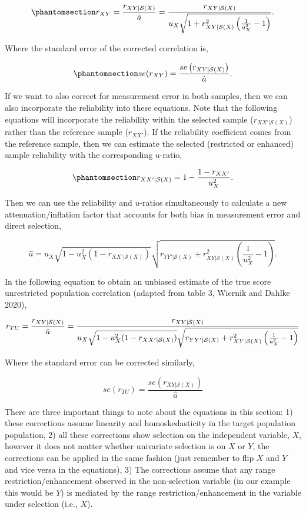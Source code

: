 \documentclass[
  letterpaper,
  DIV=11,
  numbers=noendperiod]{scrreprt}
\begin{document}
\begin{equation}\phantomsection\label{eq-univariate}{
r_{XY} = \frac{r_{XY|\mathcal{S}(X)}}{\hat{a}} = \frac{r_{XY|\mathcal{S}(X)}}{u_X\sqrt{1+r_{XY|\mathcal{S}(X)}^2\left(\frac{1}{u^2_X}-1\right)}}.
}\end{equation}

Where the standard error of the corrected correlation is,

\begin{equation}\phantomsection\label{eq-univariate-se}{
se(r_{XY}) = \frac{se\left(r_{XY|\mathcal{S}(X)}\right)}{\hat{a}}.
}\end{equation}

If we want to also correct for measurement error in both samples, then
we can also incorporate the reliability into these equations. Note that
the following equations will incorporate the reliability within the
selected sample (\(r_{XX'|\mathcal{S}(X)}\)) rather than the reference
sample (\(r_{XX'}\)). If the reliability coefficient comes from the
reference sample, then we can estimate the selected (restricted or
enhanced) sample reliability with the corresponding \(u\)-ratio,

\begin{equation}\phantomsection\label{eq-samp-reliability}{
r_{XX'|\mathcal{S}(X)} = 1-\frac{1-r_{XX'}}{u^2_X}.
}\end{equation}

Then we can use the reliability and \(u\)-ratios simultaneously to
calculate a new attenuation/inflation factor that accounts for both bias
in measurement error and direct selection,

\[
\hat{a} = u_X\sqrt{1-u_X^2(1-r_{XX'|\mathcal{S}(X)})}\sqrt{r_{YY'|\mathcal{S}(X)}+r_{XY|\mathcal{S}(X)}^2\left(\frac{1}{u^2_X}-1\right)}.
\]

In the following equation to obtain an unbiased estimate of the true
score unrestricted population correlation (adapted from table 3, Wiernik
and Dahlke 2020),

\[
\small{r_{TU}=\frac{r_{XY|\mathcal{S}(X)}}{\hat{a}} =\frac{r_{XY|\mathcal{S}(X)}}{u_X\sqrt{1-u_X^2(1-r_{XX'|\mathcal{S}(X)})}\sqrt{r_{YY'|\mathcal{S}(X)}+r_{XY|\mathcal{S}(X)}^2\left(\frac{1}{u^2_X}-1\right)}}}
\]

Where the standard error can be corrected similarly,

\[
se(r_{TU}) = \frac{se(r_{XY|\mathcal{S}(X)})}{\hat{a}}
\]

There are three important things to note about the equations in this
section: 1) these corrections assume linearity and homoskedasticity in
the target population population, 2) all these corrections show
selection on the independent variable, \(X\), however it does not matter
whether univariate selection is on \(X\) or \(Y\), the corrections can
be applied in the same fashion (just remember to flip \(X\) and \(Y\)
and vice versa in the equations), 3) The corrections assume that any
range restriction/enhancement observed in the non-selection variable (in
our example this would be \(Y\)) is mediated by the range
restriction/enhancement in the variable under selection (i.e., \(X\)).
\end{document}
